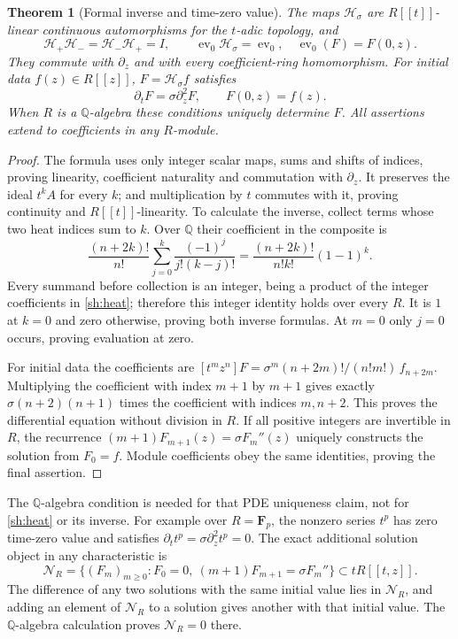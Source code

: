 \documentclass[11pt]{article}
\newtheorem{theorem}{Theorem}
\newcommand{\Q}{\mathbb Q}
\newcommand{\Ht}{\mathcal H}
\begin{document}
\begin{theorem}[Formal inverse and time-zero value]\label{sh:heatproperties}
The maps $\Ht_\sigma$ are $R[[t]]$-linear continuous
automorphisms for the $t$-adic topology, and
\begin{equation}\tag{SH16}\label{sh:inverseheat}
 \Ht_+\Ht_-=\Ht_-\Ht_+=I,\qquad
 \operatorname{ev}_0\Ht_\sigma=\operatorname{ev}_0,
 \quad\operatorname{ev}_0(F)=F(0,z).
\end{equation}
They commute with $\partial_z$ and with every coefficient-ring
homomorphism. For initial data $f(z)\in R[[z]]$,
$F=\Ht_\sigma f$ satisfies
\begin{equation}\tag{SH17}\label{sh:pde}
 \partial_tF=\sigma\partial_z^2F,\qquad F(0,z)=f(z).
\end{equation}
When $R$ is a $\Q$-algebra these conditions uniquely determine
$F$. All assertions extend to coefficients in any $R$-module.
\end{theorem}
\begin{proof}
The formula uses only integer scalar maps, sums and shifts of
indices, proving linearity, coefficient naturality and commutation
with $\partial_z$. It preserves the ideal $t^kA$ for every $k$;
and multiplication by $t$ commutes with it, proving continuity
and $R[[t]]$-linearity. To calculate the inverse, collect terms
whose two heat indices sum to $k$. Over $\Q$ their coefficient
in the composite is
\[
 \frac{(n+2k)!}{n!}
 \sum_{j=0}^k\frac{(-1)^j}{j!(k-j)!}
 =\frac{(n+2k)!}{n!k!}(1-1)^k.
\]
Every summand before collection is an integer, being a product
of the integer coefficients in \eqref{sh:heat}; therefore this
integer identity holds over every $R$. It is $1$ at $k=0$
and zero otherwise, proving both inverse formulas.
At $m=0$ only $j=0$ occurs, proving evaluation at zero.

For initial data the coefficients are
$[t^mz^n]F=\sigma^m(n+2m)!/(n!m!)\,f_{n+2m}$.
Multiplying the coefficient with index $m+1$ by $m+1$
gives exactly $\sigma(n+2)(n+1)$ times the coefficient with
indices $m,n+2$. This proves the differential equation without
division in $R$. If all positive integers are invertible in $R$,
the recurrence
$(m+1)F_{m+1}(z)=\sigma F_m''(z)$ uniquely constructs the
solution from $F_0=f$. Module coefficients obey the same
identities, proving the final assertion.
\end{proof}

The $\Q$-algebra condition is needed for that PDE uniqueness
claim, not for \eqref{sh:heat} or its inverse. For example over
$R=\mathbf F_p$, the nonzero series $t^p$ has zero time-zero
value and satisfies $\partial_t t^p=\sigma\partial_z^2t^p=0$.
The exact additional solution object in any characteristic is
\begin{equation}\tag{SH18}\label{sh:pdetorsion}
 \mathcal N_R=
 \{(F_m)_{m\ge0}:F_0=0,\ 
       (m+1)F_{m+1}=\sigma F_m''\}\subset tR[[t,z]].
\end{equation}
The difference of any two solutions with the same initial value
lies in $\mathcal N_R$, and adding an element of $\mathcal N_R$
to a solution gives another with that initial value. The
$\Q$-algebra calculation proves $\mathcal N_R=0$ there.
\end{document}
